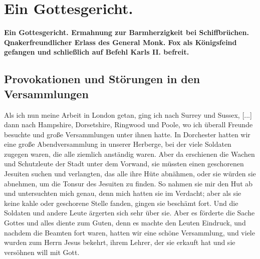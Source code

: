 
\chapter[Ein Gottesgericht.]{Ein Gottesgericht.}

\begin{center}
\textbf{Ein Gottesgericht. Ermahnung zur Barmherzigkeit bei 
Schiffbrüchen. Qnakerfreundlicher Erlass des General Monk. 
Fox als Königsfeind
gefangen und schließlich auf Befehl Karls II. befreit.}
\end{center}

\section{Provokationen und Störungen in den Versammlungen}

Als ich nun meine Arbeit in London getan, ging ich nach
Surrey und Sussex, [...] dann nach Hampshire,
 Dorsetshire,
Ringwood und Poole, wo ich überall 
Freunde besuchte und große
Versammlungen unter ihnen hatte.
In Dorchester hatten wir eine große Abendversammlung in
unserer Herberge, bei der 
viele Soldaten zugegen waren, die alle
ziemlich anständig waren. Aber da erschienen die Wachen und
Schutzleute der Stadt unter dem Vorwand, sie müssten einen 
geschorenen Jesuiten suchen und verlangten, das alle ihre Hüte 
abnähmen, oder sie würden sie abnehmen, 
um die Tonsur des Jesuiten
zu finden. So nahmen sie mir den Hut ab und untersuchten
mich genau, denn mich hatten sie im Verdacht; aber als sie keine
kahle oder geschorene Stelle fanden, gingen sie beschämt fort. Und
die Soldaten und andere Leute ärgerten sich sehr über sie. Aber
es förderte die Sache Gottes und alles diente zum Guten, denn
es machte den Leuten Eindruck, und nachdem die Beamten fort
waren, hatten wir eine schöne Versammlung, und viele wurden
zum Herrn Jesus bekehrt, ihrem Lehrer, der sie erkauft hat und
sie versöhnen will mit Gott. 


